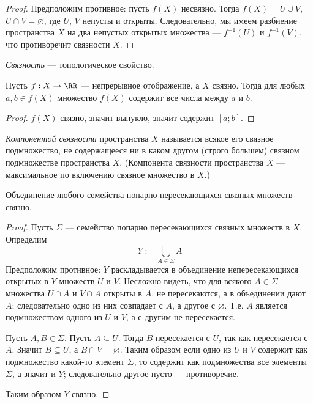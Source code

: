 \documentclass[12pt,a4paper]{article}
\begin{document}
    \begin{proof}
        Предположим противное: пусть $f(X)$ несвязно. Тогда $f(X) = U \cup V$, $U \cap V = \varnothing$, где $U$, $V$ непусты и открыты. Следовательно, мы имеем разбиение пространства $X$ на два непустых открытых множества --- $f^{-1}(U)$ и $f^{-1}(V)$, что противоречит связности $X$.
    \end{proof}

    \begin{corollary}
        \emph{Связность} --- топологическое свойство.
    \end{corollary}

    \begin{theorem}
        Пусть $f: X \to \RR$ --- непрерывное отображение, а $X$ связно. Тогда для любых $a, b \in f(X)$ множество $f(X)$ содержит все числа между $a$ и $b$.
    \end{theorem}

    \begin{proof}
        $f(X)$ связно, значит выпукло, значит содержит $[a; b]$.
    \end{proof}

    \begin{definition}
        \emph{Компонентой связности} пространства $X$ называется всякое его связное подмножество, не содержащееся ни в каком другом (строго большем) связном подмножестве пространства $X$. (Компонента связности пространства $X$ --- максимальное по включению связное множество в $X$.)
    \end{definition}

    \begin{lemma}
        Объединение любого семейства попарно пересекающихся связных множеств связно.
    \end{lemma}

    \begin{proof}
        Пусть $\Sigma$ --- семейство попарно пересекающихся связных множеств в $X$. Определим
        \[Y := \bigcup_{A \in \Sigma} A\]
        Предположим противное: $Y$ раскладывается в объединение непересекающихся открытых в $Y$ множеств $U$ и $V$. Несложно видеть, что для всякого $A \in \Sigma$ множества $U \cap A$ и $V \cap A$ открыты в $A$, не пересекаются, а в объединении дают $A$; следовательно одно из них совпадает с $A$, а другое с $\varnothing$. Т.е. $A$ является подмножеством одного из $U$ и $V$, а с другим не пересекается.

        Пусть $A, B \in \Sigma$. Пусть $A \subseteq U$. Тогда $B$ пересекается с $U$, так как пересекается с $A$. Значит $B \subseteq U$, а $B \cap V = \varnothing$. Таким образом если одно из $U$ и $V$ содержит как подмножество какой-то элемент $\Sigma$, то содержит как подмножества все элементы $\Sigma$, а значит и $Y$; следовательно другое пусто --- противоречие.

        Таким образом $Y$ связно.
    \end{proof}
\end{document}
